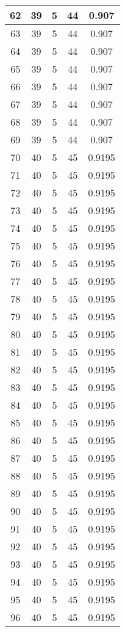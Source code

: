 \documentclass[letterpaper, 12pt]{article}
\begin{document}
\begin{longtable}{|c|c|c|c|c|}
\hline
62 & 39 & 5 & 44 & 0.907 \\
\hline
63 & 39 & 5 & 44 & 0.907 \\
\hline
64 & 39 & 5 & 44 & 0.907 \\
\hline
65 & 39 & 5 & 44 & 0.907 \\
\hline
66 & 39 & 5 & 44 & 0.907 \\
\hline
67 & 39 & 5 & 44 & 0.907 \\
\hline
68 & 39 & 5 & 44 & 0.907 \\
\hline
69 & 39 & 5 & 44 & 0.907 \\
\hline
70 & 40 & 5 & 45 & 0.9195 \\
\hline
71 & 40 & 5 & 45 & 0.9195 \\
\hline
72 & 40 & 5 & 45 & 0.9195 \\
\hline
73 & 40 & 5 & 45 & 0.9195 \\
\hline
74 & 40 & 5 & 45 & 0.9195 \\
\hline
75 & 40 & 5 & 45 & 0.9195 \\
\hline
76 & 40 & 5 & 45 & 0.9195 \\
\hline
77 & 40 & 5 & 45 & 0.9195 \\
\hline
78 & 40 & 5 & 45 & 0.9195 \\
\hline
79 & 40 & 5 & 45 & 0.9195 \\
\hline
80 & 40 & 5 & 45 & 0.9195 \\
\hline
81 & 40 & 5 & 45 & 0.9195 \\
\hline
82 & 40 & 5 & 45 & 0.9195 \\
\hline
83 & 40 & 5 & 45 & 0.9195 \\
\hline
84 & 40 & 5 & 45 & 0.9195 \\
\hline
85 & 40 & 5 & 45 & 0.9195 \\
\hline
86 & 40 & 5 & 45 & 0.9195 \\
\hline
87 & 40 & 5 & 45 & 0.9195 \\
\hline
88 & 40 & 5 & 45 & 0.9195 \\
\hline
89 & 40 & 5 & 45 & 0.9195 \\
\hline
90 & 40 & 5 & 45 & 0.9195 \\
\hline
91 & 40 & 5 & 45 & 0.9195 \\
\hline
92 & 40 & 5 & 45 & 0.9195 \\
\hline
93 & 40 & 5 & 45 & 0.9195 \\
\hline
94 & 40 & 5 & 45 & 0.9195 \\
\hline
95 & 40 & 5 & 45 & 0.9195 \\
\hline
96 & 40 & 5 & 45 & 0.9195 \\

\end{longtable}
\end{document}

